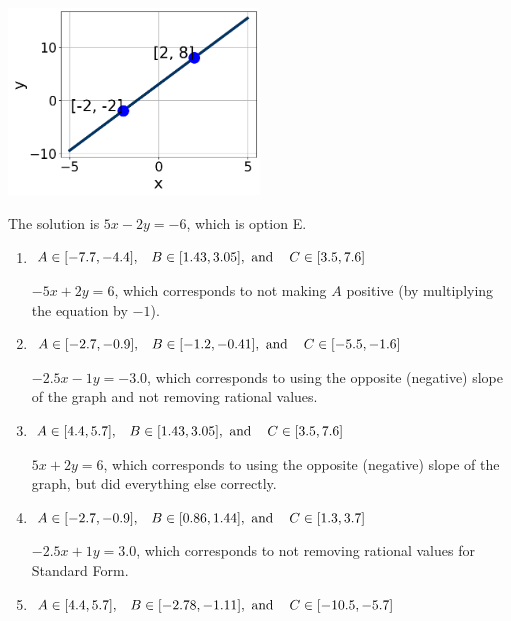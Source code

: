 \documentclass{extbook}[14pt]
\begin{document}
\begin{enumerate}
{\begin{center}
    \includegraphics[width=0.5\textwidth]{../Figures/linearGraphToStandardCopyC.png}
\end{center}



The solution is \( 5x - 2y = -6 \), which is option E.\begin{enumerate}[label=\Alph*.]
\item \( A \in [-7.7, -4.4], \hspace{3mm} B \in [1.43, 3.05], \text{ and } \hspace{3mm} C \in [3.5, 7.6] \)

 $-5x + 2y = 6$, which corresponds to not making $A$ positive (by multiplying the equation by $-1$).
\item \( A \in [-2.7, -0.9], \hspace{3mm} B \in [-1.2, -0.41], \text{ and } \hspace{3mm} C \in [-5.5, -1.6] \)

 $-2.5x - 1y = -3.0$, which corresponds to using the opposite (negative) slope of the graph and not removing rational values.
\item \( A \in [4.4, 5.7], \hspace{3mm} B \in [1.43, 3.05], \text{ and } \hspace{3mm} C \in [3.5, 7.6] \)

 $5x + 2y = 6$, which corresponds to using the opposite (negative) slope of the graph, but did everything else correctly.
\item \( A \in [-2.7, -0.9], \hspace{3mm} B \in [0.86, 1.44], \text{ and } \hspace{3mm} C \in [1.3, 3.7] \)

 $-2.5x + 1y = 3.0$, which corresponds to not removing rational values for Standard Form.
\item \( A \in [4.4, 5.7], \hspace{3mm} B \in [-2.78, -1.11], \text{ and } \hspace{3mm} C \in [-10.5, -5.7] \)


\end{enumerate}}
\end{enumerate}
\end{document}
